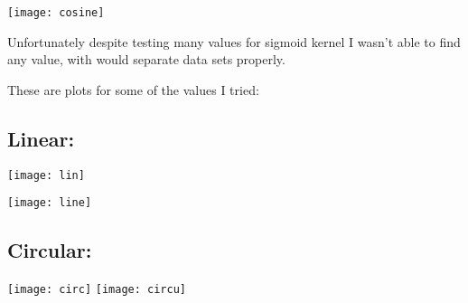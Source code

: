 \documentclass{article}
\begin{document}
\texttt{[image: cosine]}

Unfortunately despite testing many values for sigmoid kernel I wasn't able to find any value, with would separate
data sets properly.

These are plots for some of the values I tried:

\subsection{Linear:}

\texttt{[image: lin]}


\texttt{[image: line]}

\subsection{Circular:}

\texttt{[image: circ]}
\texttt{[image: circu]}
\end{document}
